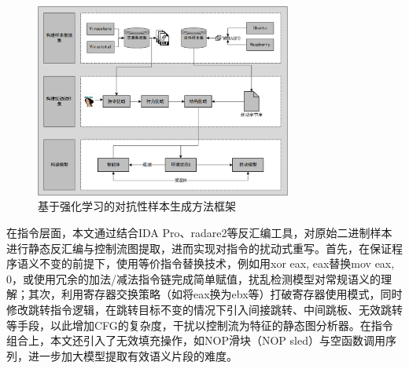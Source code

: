 \begin{figure}[hbt]
	\centering
	\includegraphics[width=0.75\textwidth]{figures/3.2}
	\caption{基于强化学习的对抗性样本生成方法框架}\label{fig:3.2}
\end{figure}


在指令层面，本文通过结合IDA Pro、radare2等反汇编工具，对原始二进制样本进行静态反汇编与控制流图提取，进而实现对指令的扰动式重写。首先，在保证程序语义不变的前提下，使用等价指令替换技术，例如用xor eax, eax替换mov eax, 0，或使用冗余的加法/减法指令链完成简单赋值，扰乱检测模型对常规语义的理解；其次，利用寄存器交换策略（如将eax换为ebx等）打破寄存器使用模式，同时修改跳转指令逻辑，在跳转目标不变的情况下引入间接跳转、中间跳板、无效跳转等手段，以此增加CFG的复杂度，干扰以控制流为特征的静态图分析器。在指令组合上，本文还引入了无效填充操作，如NOP滑块（NOP sled）与空函数调用序列，进一步加大模型提取有效语义片段的难度。


